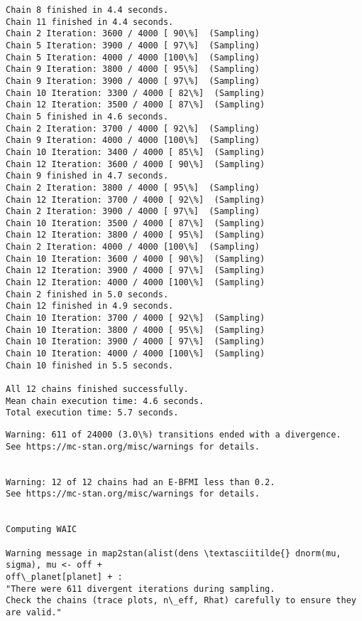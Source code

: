 \documentclass[11pt]{article}
\begin{document}
\begin{Verbatim}[commandchars=\\\{\}]
Chain 8 finished in 4.4 seconds.
Chain 11 finished in 4.4 seconds.
Chain 2 Iteration: 3600 / 4000 [ 90\%]  (Sampling)
Chain 5 Iteration: 3900 / 4000 [ 97\%]  (Sampling)
Chain 5 Iteration: 4000 / 4000 [100\%]  (Sampling)
Chain 9 Iteration: 3800 / 4000 [ 95\%]  (Sampling)
Chain 9 Iteration: 3900 / 4000 [ 97\%]  (Sampling)
Chain 10 Iteration: 3300 / 4000 [ 82\%]  (Sampling)
Chain 12 Iteration: 3500 / 4000 [ 87\%]  (Sampling)
Chain 5 finished in 4.6 seconds.
Chain 2 Iteration: 3700 / 4000 [ 92\%]  (Sampling)
Chain 9 Iteration: 4000 / 4000 [100\%]  (Sampling)
Chain 10 Iteration: 3400 / 4000 [ 85\%]  (Sampling)
Chain 12 Iteration: 3600 / 4000 [ 90\%]  (Sampling)
Chain 9 finished in 4.7 seconds.
Chain 2 Iteration: 3800 / 4000 [ 95\%]  (Sampling)
Chain 12 Iteration: 3700 / 4000 [ 92\%]  (Sampling)
Chain 2 Iteration: 3900 / 4000 [ 97\%]  (Sampling)
Chain 10 Iteration: 3500 / 4000 [ 87\%]  (Sampling)
Chain 12 Iteration: 3800 / 4000 [ 95\%]  (Sampling)
Chain 2 Iteration: 4000 / 4000 [100\%]  (Sampling)
Chain 10 Iteration: 3600 / 4000 [ 90\%]  (Sampling)
Chain 12 Iteration: 3900 / 4000 [ 97\%]  (Sampling)
Chain 12 Iteration: 4000 / 4000 [100\%]  (Sampling)
Chain 2 finished in 5.0 seconds.
Chain 12 finished in 4.9 seconds.
Chain 10 Iteration: 3700 / 4000 [ 92\%]  (Sampling)
Chain 10 Iteration: 3800 / 4000 [ 95\%]  (Sampling)
Chain 10 Iteration: 3900 / 4000 [ 97\%]  (Sampling)
Chain 10 Iteration: 4000 / 4000 [100\%]  (Sampling)
Chain 10 finished in 5.5 seconds.

All 12 chains finished successfully.
Mean chain execution time: 4.6 seconds.
Total execution time: 5.7 seconds.

    \end{Verbatim}

    \begin{Verbatim}[commandchars=\\\{\}]
Warning: 611 of 24000 (3.0\%) transitions ended with a divergence.
See https://mc-stan.org/misc/warnings for details.


Warning: 12 of 12 chains had an E-BFMI less than 0.2.
See https://mc-stan.org/misc/warnings for details.


Computing WAIC

Warning message in map2stan(alist(dens \textasciitilde{} dnorm(mu, sigma), mu <- off +
off\_planet[planet] + :
"There were 611 divergent iterations during sampling.
Check the chains (trace plots, n\_eff, Rhat) carefully to ensure they are valid."
    \end{Verbatim}
\end{document}
